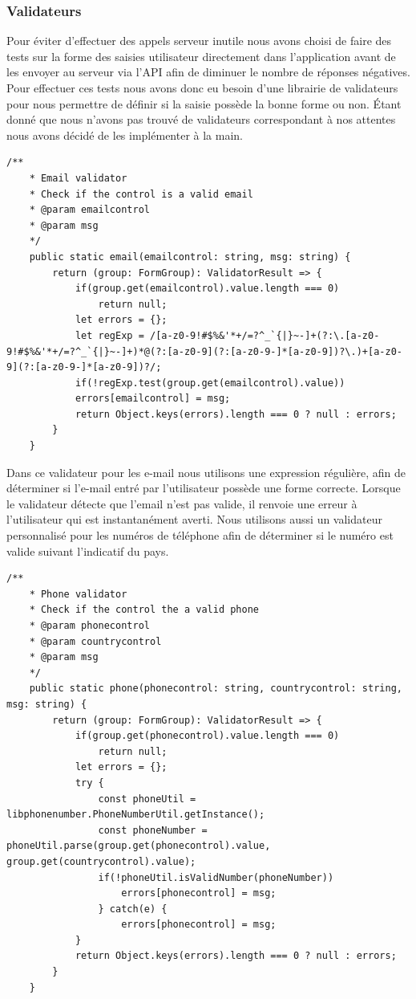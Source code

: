 \documentclass[french]{article}
\begin{document}
	\subsubsection{Validateurs}
	
	Pour éviter d'effectuer des appels serveur inutile nous avons choisi de faire des tests sur la forme des saisies utilisateur directement dans l'application avant de les envoyer au serveur via l'API afin de diminuer le nombre de réponses négatives. Pour effectuer ces tests nous avons donc eu besoin d'une librairie de validateurs pour nous permettre de définir si la saisie possède la bonne forme ou non. 
	Étant donné que nous n'avons pas trouvé de validateurs correspondant à nos attentes nous avons décidé de les implémenter à la main.
	
	\begin{lstlisting}[style=htmlcssjs]
	/**
	* Email validator
	* Check if the control is a valid email
	* @param emailcontrol
	* @param msg
	*/
	public static email(emailcontrol: string, msg: string) {
		return (group: FormGroup): ValidatorResult => {
			if(group.get(emailcontrol).value.length === 0)
				return null;
			let errors = {};
			let regExp = /[a-z0-9!#$%&'*+/=?^_`{|}~-]+(?:\.[a-z0-9!#$%&'*+/=?^_`{|}~-]+)*@(?:[a-z0-9](?:[a-z0-9-]*[a-z0-9])?\.)+[a-z0-9](?:[a-z0-9-]*[a-z0-9])?/;
			if(!regExp.test(group.get(emailcontrol).value))
			errors[emailcontrol] = msg;
			return Object.keys(errors).length === 0 ? null : errors;
		}
	}
	\end{lstlisting}
	
	Dans ce validateur pour les e-mail nous utilisons une expression régulière, afin de déterminer si l'e-mail entré par l'utilisateur possède une forme correcte. Lorsque le validateur détecte que l'email n'est pas valide, il renvoie une erreur à l'utilisateur qui est instantanément averti.
	Nous utilisons aussi un validateur personnalisé pour les numéros de téléphone afin de déterminer si le numéro est valide suivant l'indicatif du pays. 
	\begin{lstlisting}[style=htmlcssjs]
	/**
	* Phone validator
	* Check if the control the a valid phone
	* @param phonecontrol
	* @param countrycontrol
	* @param msg
	*/
	public static phone(phonecontrol: string, countrycontrol: string, msg: string) {
		return (group: FormGroup): ValidatorResult => {
			if(group.get(phonecontrol).value.length === 0)
				return null;
			let errors = {};
			try {
				const phoneUtil = libphonenumber.PhoneNumberUtil.getInstance();
				const phoneNumber = phoneUtil.parse(group.get(phonecontrol).value, group.get(countrycontrol).value);
				if(!phoneUtil.isValidNumber(phoneNumber))
					errors[phonecontrol] = msg;
				} catch(e) {
					errors[phonecontrol] = msg;
			}
			return Object.keys(errors).length === 0 ? null : errors;
		}
	}
	\end{lstlisting}
	
\end{document}
